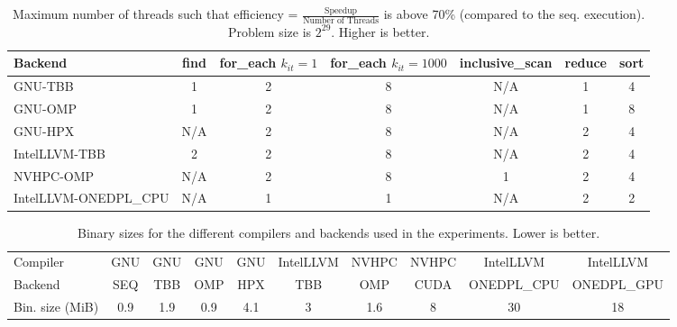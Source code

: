 \documentclass[sigconf]{acmart}
\begin{document}
\begin{table}[t]
      \centering
      \centering
      \caption{Maximum number of threads such that efficiency = $\frac{\text{Speedup}}{\text{Number of Threads}}$ is above 70\% (compared to the seq. execution). Problem size is $2^{29}$. Higher is better.}\label{tab:summary_maxspeedup}
      \begin{tabular}{l c c c c c c}
            \hline
            \textbf{Backend}      & \textbf{find} & \makecell{\textbf{for\_each}                   \\$k_{it}=1$} & \makecell{\textbf{for\_each}\\$k_{it}=1000$} & \textbf{inclusive\_scan} & \textbf{reduce} & \textbf{sort} \\
            \hline
            GNU-TBB               & 1             & 2                            & 8 & N/A & 1 & 4 \\
            GNU-OMP               & 1             & 2                            & 8 & N/A & 1 & 8 \\
            GNU-HPX               & N/A           & 2                            & 8 & N/A & 2 & 4 \\
            IntelLLVM-TBB         & 2             & 2                            & 8 & N/A & 2 & 4 \\
            NVHPC-OMP             & N/A           & 2                            & 8 & 1   & 2 & 4 \\
            IntelLLVM-ONEDPL\_CPU & N/A           & 1                            & 1 & N/A & 2 & 2 \\
            \hline
      \end{tabular}
\end{table}

\begin{table}[t]
      \centering
      \centering
      \caption{ Binary sizes for the different compilers and backends used in the experiments. Lower is better.}\label{tab:summary_binary}
      \begin{tabular}{l c c c c c c c c c}
            \hline
            Compiler        & GNU & GNU & GNU & GNU & IntelLLVM & NVHPC & NVHPC & IntelLLVM   & IntelLLVM   \\
            Backend         & SEQ & TBB & OMP & HPX & TBB       & OMP   & CUDA  & ONEDPL\_CPU & ONEDPL\_GPU \\
            \hline
            Bin. size (MiB) & 0.9 & 1.9 & 0.9 & 4.1 & 3         & 1.6   & 8     & 30          & 18          \\
            \hline
      \end{tabular}
\end{table}
\end{document}

